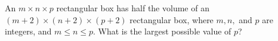 An $m\times n\times p$ rectangular box has half the volume of an $(m+2)\times(n+2)\times(p+2)$ rectangular box, where $m, n,$ and $p$ are integers, and $m\le n\le p.$  What is the largest possible value of $p$?